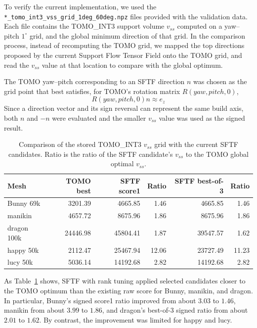 \documentclass[11pt,a4paper]{article}
\begin{document}
To verify the current implementation, we used the
\texttt{*\_tomo\_int3\_vss\_grid\_1deg\_60deg.npz} files provided with the validation data.
Each file contains the TOMO\_INT3 support volume $v_{ss}$ computed on a yaw--pitch $1^\circ$ grid,
and the global minimum direction of that grid.
In the comparison process, instead of recomputing the TOMO grid,
we mapped the top directions proposed by the current Support Flow Tensor Field onto the TOMO grid,
and read the $v_{ss}$ value at that location to compare with the global optimum.

The TOMO yaw--pitch corresponding to an SFTF direction $n$ was chosen as the grid point that best satisfies,
for TOMO's rotation matrix $R(yaw,pitch,0)$,
\begin{equation}
R(yaw,pitch,0)n \approx e_z
\end{equation}
Since a direction vector and its sign reversal can represent the same build axis,
both $n$ and $-n$ were evaluated and the smaller $v_{ss}$ value was used as the signed result.

\begin{table}[H]
\centering
\caption{Comparison of the stored TOMO\_INT3 $v_{ss}$ grid with the current SFTF candidates.
Ratio is the ratio of the SFTF candidate's $v_{ss}$ to the TOMO global optimal $v_{ss}$.}
\label{tab:sftf-tomo-comparison}
\begin{tabular}{lrrrrr}
\toprule
Mesh & TOMO best & SFTF score1 & Ratio & SFTF best-of-3 & Ratio\\
\midrule
Bunny 69k & 3201.39 & 4665.85 & 1.46 & 4665.85 & 1.46\\
manikin & 4657.72 & 8675.96 & 1.86 & 8675.96 & 1.86\\
dragon 100k & 24446.98 & 45804.41 & 1.87 & 39547.57 & 1.62\\
happy 50k & 2112.47 & 25467.94 & 12.06 & 23727.49 & 11.23\\
lucy 50k & 5036.14 & 14192.68 & 2.82 & 14192.68 & 2.82\\
\bottomrule
\end{tabular}
\end{table}

As Table~\ref{tab:sftf-tomo-comparison} shows,
SFTF with rank tuning applied selected candidates closer to the TOMO optimum than the existing raw score for Bunny, manikin, and dragon.
In particular, Bunny's signed score1 ratio improved from about $3.03$ to $1.46$,
manikin from about $3.99$ to $1.86$,
and dragon's best-of-3 signed ratio from about $2.01$ to $1.62$.
By contrast, the improvement was limited for happy and lucy.
\end{document}
